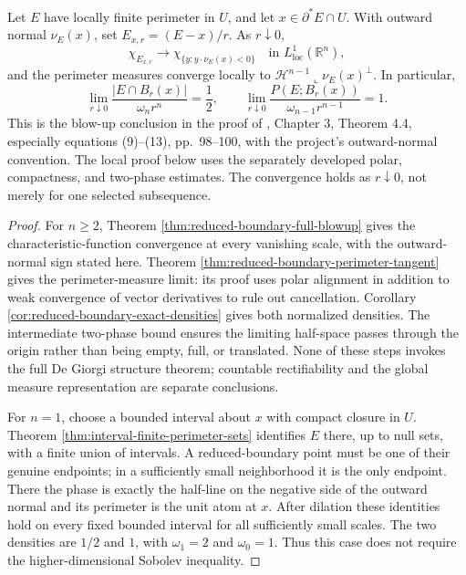\begin{theorem}\label{thm:perimeter-halfspace-blowup}
Let $E$ have locally finite perimeter in $U$, and let $x\in\partial^*E\cap U$. With outward normal $\nu_E(x)$, set $E_{x,r}=(E-x)/r$. As $r\downarrow0$,
\[
 \chi_{E_{x,r}}\longrightarrow\chi_{\{y:y\cdot\nu_E(x)<0\}}
 \quad\text{in }L^1_{\mathrm{loc}}(\mathbb R^n),
\]
and the perimeter measures converge locally to $\mathcal H^{n-1}\llcorner\nu_E(x)^\perp$. In particular,
\[
 \lim_{r\downarrow0}\frac{|E\cap B_r(x)|}{\omega_nr^n}=\frac12,
 \qquad
 \lim_{r\downarrow0}\frac{P(E;B_r(x))}{\omega_{n-1}r^{n-1}}=1.
\]
This is the blow-up conclusion in the proof of \cite{Sim18}, Chapter 3, Theorem 4.4, especially equations (9)--(13), pp.~98--100, with the project's outward-normal convention. The local proof below uses the separately developed polar, compactness, and two-phase estimates. The convergence holds as $r\downarrow0$, not merely for one selected subsequence.
\end{theorem}
\begin{proof}
For $n\geq2$, Theorem \ref{thm:reduced-boundary-full-blowup} gives the characteristic-function convergence at every vanishing scale, with the outward-normal sign stated here. Theorem \ref{thm:reduced-boundary-perimeter-tangent} gives the perimeter-measure limit: its proof uses polar alignment in addition to weak convergence of vector derivatives to rule out cancellation. Corollary \ref{cor:reduced-boundary-exact-densities} gives both normalized densities. The intermediate two-phase bound ensures the limiting half-space passes through the origin rather than being empty, full, or translated. None of these steps invokes the full De Giorgi structure theorem; countable rectifiability and the global measure representation are separate conclusions.

For $n=1$, choose a bounded interval about $x$ with compact closure in $U$. Theorem \ref{thm:interval-finite-perimeter-sets} identifies $E$ there, up to null sets, with a finite union of intervals. A reduced-boundary point must be one of their genuine endpoints; in a sufficiently small neighborhood it is the only endpoint. There the phase is exactly the half-line on the negative side of the outward normal and its perimeter is the unit atom at $x$. After dilation these identities hold on every fixed bounded interval for all sufficiently small scales. The two densities are $1/2$ and $1$, with $\omega_1=2$ and $\omega_0=1$. Thus this case does not require the higher-dimensional Sobolev inequality.
\end{proof}

